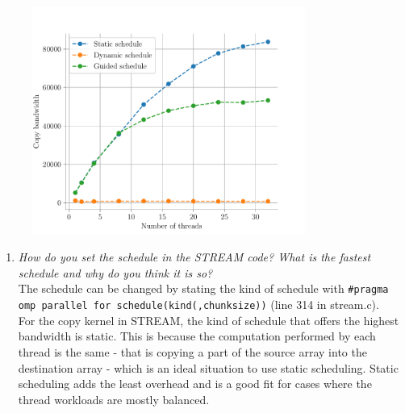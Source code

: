 \documentclass[12pt]{article}
\begin{document}
\begin{enumerate}
\begin{figure}[H]
			\includegraphics[width=0.8\textwidth]{stream2.pdf}
		\end{figure}
		\begin{enumerate}
			\item \textit{How do you set the schedule in the STREAM code? What is the fastest schedule and why do you think it is so?}\\
			The schedule can be changed by stating the kind of schedule with \texttt{\#pragma omp parallel for schedule(kind(,chunksize))} (line 314 in stream.c).\\
			For the copy kernel in STREAM, the kind of schedule that offers the highest bandwidth is static. This is because the computation performed by each thread is the same - that is copying a part of the source array into the destination array - which is an ideal situation to use static scheduling. Static scheduling adds the least overhead and is a good fit for cases where the thread workloads are mostly balanced.
		\end{enumerate}
	\end{enumerate}
\end{document}
